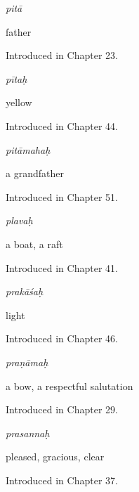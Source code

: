 \noindent\begin{minipage}[t]{\linewidth}
\raggedright
\textbf{}\enspace\emph{pitā}\par
\small father\par
\footnotesize Introduced in Chapter 23.
\end{minipage}\par\medskip

\noindent\begin{minipage}[t]{\linewidth}
\raggedright
\textbf{}\enspace\emph{pītaḥ}\par
\small yellow\par
\footnotesize Introduced in Chapter 44.
\end{minipage}\par\medskip

\noindent\begin{minipage}[t]{\linewidth}
\raggedright
\textbf{}\enspace\emph{pitāmahaḥ}\par
\small a grandfather\par
\footnotesize Introduced in Chapter 51.
\end{minipage}\par\medskip

\noindent\begin{minipage}[t]{\linewidth}
\raggedright
\textbf{}\enspace\emph{plavaḥ}\par
\small a boat, a raft\par
\footnotesize Introduced in Chapter 41.
\end{minipage}\par\medskip

\noindent\begin{minipage}[t]{\linewidth}
\raggedright
\textbf{}\enspace\emph{prakāśaḥ}\par
\small light\par
\footnotesize Introduced in Chapter 46.
\end{minipage}\par\medskip

\noindent\begin{minipage}[t]{\linewidth}
\raggedright
\textbf{}\enspace\emph{praṇāmaḥ}\par
\small a bow, a respectful salutation\par
\footnotesize Introduced in Chapter 29.
\end{minipage}\par\medskip

\noindent\begin{minipage}[t]{\linewidth}
\raggedright
\textbf{}\enspace\emph{prasannaḥ}\par
\small pleased, gracious, clear\par
\footnotesize Introduced in Chapter 37.
\end{minipage}\par\medskip

